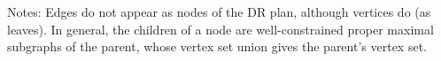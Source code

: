 \documentclass[11pt]{article}
\begin{document}














\pnplaceholder
Notes:
Edges do not appear as nodes of the DR plan, although vertices do (as leaves). In general, the children of a node are well-constrained proper maximal subgraphs of the parent, whose vertex set union gives the parent's vertex set.
\end{document}
